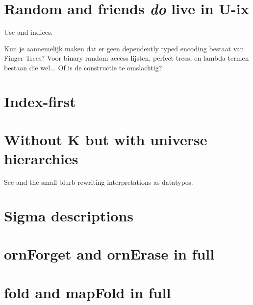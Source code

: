 \appendix


\section{Random and friends \textit{do} live in U-ix}\label{app:unnested}
Use  and indices.

\begin{outline}
Kun je aannemelijk maken dat er geen dependently typed encoding bestaat van Finger Trees? Voor binary random access lijsten, perfect trees, en lambda termen bestaan die wel... Of is de constructie te omslachtig?
\end{outline}

\section{Index-first}

\section{Without K but with universe hierarchies}\label{app:withoutk}
See \cite{practgen} and the small blurb rewriting interpretations as datatypes.

\section{Sigma descriptions}\label{app:large-sigma}

\section{ornForget and ornErase in full}\label{app:ornforget}

\section{fold and mapFold in full}\label{app:gfold}

